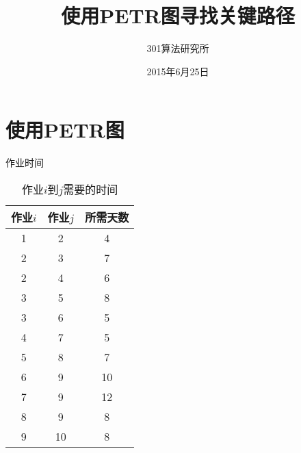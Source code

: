 \documentclass[presentation]{beamer}
\begin{document}
\begin{CJK*}{UTF8}{gbsn}
	\title{使用PETR图寻找关键路径}
	\author[\href{https://github.com/Lixinyi-DUT/Project-Wuhu}{芜湖计划}]{
		301算法研究所 \\
	   }
	\date[2015/6/25]{2015年6月25日}
	\begin{frame}
		\maketitle
	\end{frame}
\section{使用PETR图}
\begin{frame}{作业时间}
   \begin{center}
   \begin{table}
   \begin{tabular}{c|c|c}
   	 \hline
   	 作业$i$ & 作业$j$ & 所需天数 \\
   	 \hline
   	 1 & 2 & 4 \\
   	 2 & 3 & 7 \\
   	 2 & 4 & 6 \\
   	 3 & 5 & 8 \\
   	 3 & 6 & 5 \\
   	 4 & 7 & 5 \\
   	 5 & 8 & 7 \\
   	 6 & 9 & 10 \\
   	 7 & 9 & 12 \\
   	 8 & 9 & 8 \\
   	 9 & 10 & 8 \\
   	 \hline
   \end{tabular}
   \caption[表1]{作业$i$到$j$需要的时间}
   \end{table}
   \end{center}
\end{frame}


\end{CJK*}
\end{document}
